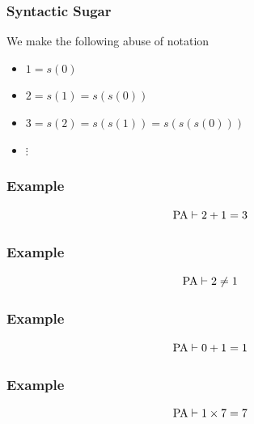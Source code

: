 \documentclass{beamer}
\theoremstyle{indentDefn} \newtheorem{defn}[]{Definition}
\begin{document}
\begin{frame}
	\frametitle{Syntactic Sugar}
	
	We make the following abuse of notation 
	\begin{center}
		\begin{itemize}
			\item[] $1 = s(0)$
			\item[] $2 = s(1) = s(s(0))$
			\item[] $3 = s(2) = s(s(1)) = s(s(s(0)))$
			\item[] $\vdots$
		\end{itemize}
	\end{center}
	
\end{frame}

\begin{frame}
	\frametitle{Example}
	
	$$ \text{PA} \vdash 2 + 1 = 3$$
	
	\vspace{60mm}
	
	
\end{frame}

\begin{frame}
	\frametitle{Example}
	
	$$ \text{PA} \vdash 2 \neq 1$$

	\vspace{65mm}
	
	
\end{frame}

\begin{frame}
	\frametitle{Example}
	
	$$ \text{PA} \vdash 0 + 1 = 1$$
	
	\vspace{65mm}
	
\end{frame}

\begin{frame}
	\frametitle{Example}
	
	$$ \text{PA} \vdash 1 \times 7 = 7$$
	
	\vspace{65mm}
	
\end{frame}
\end{document}
